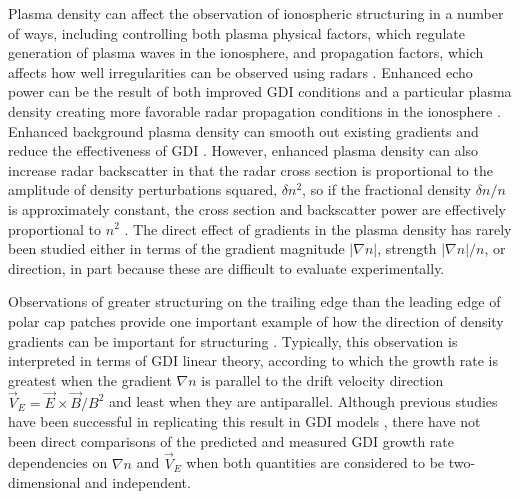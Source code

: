 Plasma density can affect the observation of ionospheric structuring in a number of ways, including controlling both plasma physical factors, which regulate generation of plasma waves in the ionosphere, and propagation factors, which affects how well irregularities can be observed using radars \citep[e.g.][]{Danskin2002,Koustov2004,Lamarche2015}.  Enhanced echo power can be the result of both improved GDI conditions and a particular plasma density creating more favorable radar propagation conditions in the ionosphere  \citep[e.g.][]{Koustov2012}.  Enhanced background plasma density can smooth out existing gradients and reduce the effectiveness of GDI \citep{Ruohoniemi1997}.  However, enhanced plasma density can also increase radar backscatter in that the radar cross section is proportional to the amplitude of density perturbations squared, \(\delta n^2\), so if the fractional density \(\delta n/n\) is approximately constant, the cross section and backscatter power are effectively proportional to \(n^2\) \citep{Makarevich2014b}.  The direct effect of gradients in the plasma density has rarely been studied either in terms of the gradient magnitude \(\lvert\nabla n\rvert\), strength \(\lvert\nabla n\rvert/n\), or direction, in part because these are difficult to evaluate experimentally.

Observations of greater structuring on the trailing edge than the leading edge of polar cap patches provide one important example of how the direction of density gradients can be important for structuring \citep[e.g.][]{Weber1984,Milan2002b,Koustov2012,Moen2012}. Typically, this observation is interpreted in terms of GDI linear theory, according to which the growth rate is greatest when the gradient \(\nabla n\) is parallel to the drift velocity direction \(\vec{V}_E = \vec{E}\times\vec{B}/B^2\) and least when they are antiparallel.  Although previous studies have been successful in replicating this result in GDI models \citep{Gondarenko2004b,Gondarenko2006}, there have not been direct comparisons of the predicted and measured GDI growth rate dependencies on \(\nabla n\) and \(\vec{V}_E\) when both quantities are considered to be two-dimensional and independent.

